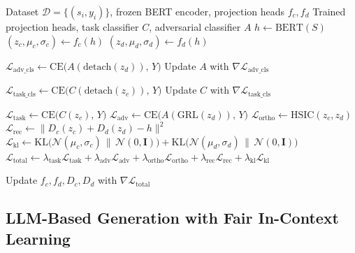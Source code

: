 \documentclass[runningheads]{llncs}
\begin{document}
\begin{algorithm}[t]
\caption{SENNA Training}
\label{alg:training}
\begin{algorithmic}[1]
\Require Dataset $\mathcal{D}=\{(s_i,y_i)\}$, frozen BERT encoder, projection heads $f_c,f_d$
\Ensure Trained projection heads, task classifier $C$, adversarial classifier $A$
        \State $h \gets \mathrm{BERT}(S)$ 
        \State $(z_c,\mu_c,\sigma_c) \gets f_c(h)$ 
        \State $(z_d,\mu_d,\sigma_d) \gets f_d(h)$ 

        \State $\mathcal{L}_{\mathrm{adv\_cls}} \gets \mathrm{CE}\!\big(A(\mathrm{detach}(z_d)),\,Y\big)$
        \State Update $A$ with $\nabla \mathcal{L}_{\mathrm{adv\_cls}}$

        \State $\mathcal{L}_{\mathrm{task\_cls}} \gets \mathrm{CE}\!\big(C(\mathrm{detach}(z_c)),\,Y\big)$
        \State Update $C$ with $\nabla \mathcal{L}_{\mathrm{task\_cls}}$

        \State $\mathcal{L}_{\mathrm{task}} \gets \mathrm{CE}\!\big(C(z_c),\,Y\big)$
        \State $\mathcal{L}_{\mathrm{adv}} \gets \mathrm{CE}\!\big(A(\mathrm{GRL}(z_d)),\,Y\big)$
        \State $\mathcal{L}_{\mathrm{ortho}} \gets \mathrm{HSIC}(z_c,z_d)$
        \State $\mathcal{L}_{\mathrm{rec}} \gets \lVert D_c(z_c)+D_d(z_d)-h\rVert^2$
        \State $\mathcal{L}_{\mathrm{kl}} \gets
        \mathrm{KL}\!\big(\mathcal{N}(\mu_c,\sigma_c)\,\|\,\mathcal{N}(0,\mathbf{I})\big)
        +\mathrm{KL}\!\big(\mathcal{N}(\mu_d,\sigma_d)\,\|\,\mathcal{N}(0,\mathbf{I})\big)$
        \State $\mathcal{L}_{\mathrm{total}} \gets
        \lambda_{\mathrm{task}}\mathcal{L}_{\mathrm{task}}
        +\lambda_{\mathrm{adv}}\mathcal{L}_{\mathrm{adv}}
        +\lambda_{\mathrm{ortho}}\mathcal{L}_{\mathrm{ortho}}
        +\lambda_{\mathrm{rec}}\mathcal{L}_{\mathrm{rec}}
        +\lambda_{\mathrm{kl}}\mathcal{L}_{\mathrm{kl}}$

        \State Update $f_c,f_d,D_c,D_d$ with $\nabla \mathcal{L}_{\mathrm{total}}$
    \EndFor
\EndFor
\end{algorithmic}
\end{algorithm}

\subsection{LLM-Based Generation with Fair In-Context Learning}
\end{document}
